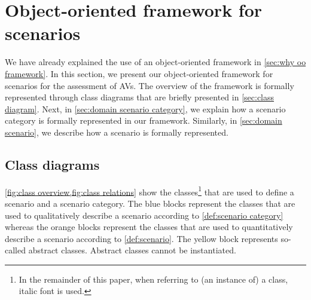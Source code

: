 \cstartb
\section{Object-oriented framework for scenarios}
\label{sec:oo framework}
\cendb

We have already explained the use of an \cstartb object-oriented framework \cendb in \cref{sec:why oo framework}. In this section, we present our \cstartb object-oriented framework \cendb for scenarios for the assessment of AVs. 
The \cstartb overview of the framework \cendb is formally represented through \cstartb class diagrams \cendb that are briefly presented in \cref{sec:class diagram}. Next, in \cref{sec:domain scenario category}, we explain how a scenario category is formally represented \cstartb in our framework\cendb. Similarly, in \cref{sec:domain scenario}, we describe how a scenario is formally represented. 



\cstartb
\subsection{Class diagrams}\cendb
\label{sec:class diagram}

\cstartd \cref{fig:class overview,fig:class relations} show the classes\footnote{In the remainder of this paper, when referring to (an instance of) a class, italic font is used.} that are used to define a scenario and a scenario category. \cendd
The blue blocks represent the classes that are used to qualitatively describe a scenario according to \cref{def:scenario category} whereas the orange blocks represent the classes that are used to quantitatively describe a scenario according to \cref{def:scenario}. \cstartb The yellow block represents so-called abstract classes. Abstract classes cannot be instantiated. \cendb

